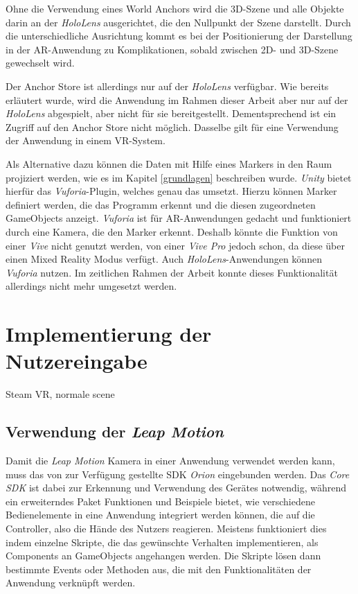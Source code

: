 Ohne die Verwendung eines World Anchors wird die 3D-Szene und alle Objekte darin an der \textit{HoloLens} ausgerichtet, die den Nullpunkt der Szene darstellt. Durch die unterschiedliche Ausrichtung kommt es bei der Positionierung der Darstellung in der AR-Anwendung zu Komplikationen, sobald zwischen 2D- und 3D-Szene gewechselt wird. 

Der Anchor Store ist allerdings nur auf der \textit{HoloLens} verfügbar. Wie bereits erläutert wurde, wird die Anwendung im Rahmen dieser Arbeit aber nur auf der \textit{HoloLens} abgespielt, aber nicht für sie bereitgestellt. Dementsprechend ist ein Zugriff auf den Anchor Store nicht möglich. Dasselbe gilt für eine Verwendung der Anwendung in einem VR-System.

Als Alternative dazu können die Daten mit Hilfe eines Markers in den Raum projiziert werden, wie es im Kapitel \ref{grundlagen} beschreiben wurde. \textit{Unity} bietet hierfür das \textit{Vuforia}-Plugin, welches genau das umsetzt. Hierzu können Marker definiert werden, die das Programm erkennt und die diesen zugeordneten GameObjects anzeigt. 
\textit{Vuforia} ist für AR-Anwendungen gedacht und funktioniert durch eine Kamera, die den Marker erkennt. Deshalb könnte die Funktion von einer \textit{Vive} nicht genutzt werden, von einer \textit{Vive Pro} jedoch schon, da diese über einen Mixed Reality Modus verfügt. Auch \textit{HoloLens}-Anwendungen können \textit{Vuforia} nutzen. 
Im zeitlichen Rahmen der Arbeit konnte dieses Funktionalität allerdings nicht mehr umgesetzt werden.

\section{Implementierung der Nutzereingabe}
Steam VR, normale scene


\subsection{Verwendung der \textit{Leap Motion}}

Damit die \textit{Leap Motion} Kamera in einer Anwendung verwendet werden kann, muss das von \cite{orion} zur Verfügung gestellte SDK \textit{Orion} eingebunden werden. Das \textit{Core SDK} ist dabei zur Erkennung und Verwendung des Gerätes notwendig, während ein erweiterndes Paket Funktionen und Beispiele bietet, wie verschiedene Bedienelemente in eine Anwendung integriert werden können, die auf die Controller, also die Hände des Nutzers reagieren.
Meistens funktioniert dies indem einzelne Skripte, die das gewünschte Verhalten implementieren, als Components an GameObjects angehangen werden. Die Skripte lösen dann bestimmte Events oder Methoden aus, die mit den Funktionalitäten der Anwendung verknüpft werden. 

